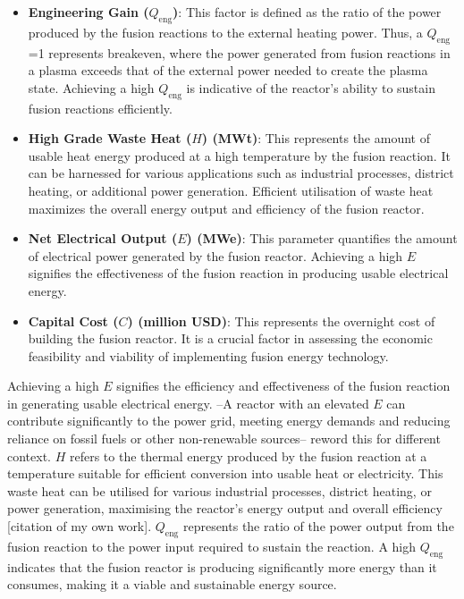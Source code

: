 \documentclass[journal]{IEEEtran}
\begin{document}
\begin{itemize}
    \item \textbf{Engineering Gain ($Q_{\text{eng}}$)}: This factor is defined as the ratio of the power produced by the fusion reactions to the external heating power.  Thus, a $Q_{\text{eng}}$=1 represents breakeven, where the power generated from fusion reactions in a plasma exceeds that of the external power needed to create the plasma state. Achieving a high $Q_{\text{eng}}$ is indicative of the reactor's ability to sustain fusion reactions efficiently. 
    \item \textbf{High Grade Waste Heat ($H$) (MWt)}: This represents the amount of usable heat energy produced at a high temperature by the fusion reaction. It can be harnessed for various applications such as industrial processes, district heating, or additional power generation. Efficient utilisation of waste heat maximizes the overall energy output and efficiency of the fusion reactor.
    \item \textbf{Net Electrical Output ($E$) (MWe)}: This parameter quantifies the amount of electrical power generated by the fusion reactor. Achieving a high $E$ signifies the effectiveness of the fusion reaction in producing usable electrical energy.
    \item \textbf{Capital Cost ($C$) (million USD)}: This represents the overnight cost of building the fusion reactor. It is a crucial factor in assessing the economic feasibility and viability of implementing fusion energy technology.
\end{itemize}

Achieving a high $E$ signifies the efficiency and effectiveness of the fusion reaction in generating usable electrical energy. --A reactor with an elevated $E$ can contribute significantly to the power grid, meeting energy demands and reducing reliance on fossil fuels or other non-renewable sources-- reword this for different context. $H$ refers to the thermal energy produced by the fusion reaction at a temperature suitable for efficient conversion into usable heat or electricity. This waste heat can be utilised for various industrial processes, district heating, or power generation, maximising the reactor's energy output and overall efficiency [citation of my own work]. $Q_{\text{eng}}$ represents the ratio of the power output from the fusion reaction to the power input required to sustain the reaction. A high $Q_{\text{eng}}$ indicates that the fusion reactor is producing significantly more energy than it consumes, making it a viable and sustainable energy source.
\end{document}
